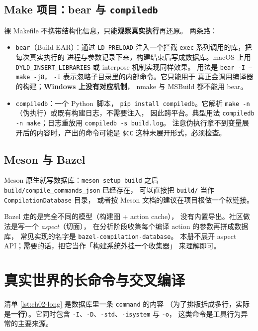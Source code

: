 \documentclass[12pt,a4paper,fontset=fandol]{ctexbook}
\newcommand{\Lang}[1]{\textsf{#1}}
\newcommand{\PY}{\Lang{Python}}
\begin{document}
\subsection*{Make 项目：bear 与 \texttt{compiledb}}

裸 Makefile 不携带结构化信息，只能\textbf{观察真实执行}再还原。
两条路：

\begin{itemize}
  \item \texttt{bear}（Build EAR）：通过 \texttt{LD\_PRELOAD}
        注入一个拦截 \texttt{exec} 系列调用的库，把每次真实执行的
        进程与参数记录下来，构建结束后写成数据库。macOS 上用
        \texttt{DYLD\_INSERT\_LIBRARIES} 或 interpose 机制实现同样效果。
        用法是 \texttt{bear -I -- make -j8}，
        \texttt{-I} 表示忽略子目录里的内部命令。它只能用于
        真正会调用编译器的构建；\textbf{Windows 上没有对应机制}，
        nmake 与 MSBuild 都不能用 bear。
  \item \texttt{compiledb}：一个 \PY\ 脚本，
        \texttt{pip install compiledb}。它解析
        \texttt{make -n}（伪执行）或既有构建日志，不需要注入，
        因此跨平台。典型用法
        \texttt{compiledb -n make}；日志重放用
        \texttt{compiledb -s build.log}。
        注意伪执行拿不到变量展开后的内容时，产出的命令可能是
        \texttt{\$CC} 这种未展开形式，必须检查。
\end{itemize}

\subsection*{Meson 与 Bazel}

Meson 原生就写数据库：\texttt{meson setup build} 之后
\texttt{build/compile\_\allowbreak commands\_\allowbreak json} 已经存在，
可以直接把 \texttt{build/} 当作 \texttt{Compilation\allowbreak Database} 目录，
或者按 Meson 文档的建议在项目根做一个软链接。

Bazel 走的是完全不同的模型（构建图 + action cache），
没有内置导出。社区做法是写一个 \emph{aspect}（切面），
在分析阶段收集每个编译 action 的参数再拼成数据库，
常见实现的名字是 \texttt{bazel-compilation-database}。
本册不展开 aspect API；需要的话，把它当作「构建系统外挂一个收集器」
来理解即可。

\section{真实世界的长命令与交叉编译}
\label{sec:ch02-s4}

清单 \ref{lst:ch02-long} 是数据库里一条 \texttt{command} 的内容
（为了排版拆成多行，实际是\textbf{一行}）。它同时包含
\texttt{-I}、\texttt{-D}、\texttt{-std}、\texttt{-isystem} 与 \texttt{-o}，
这类命令是工具行为异常的主要来源。
\end{document}
